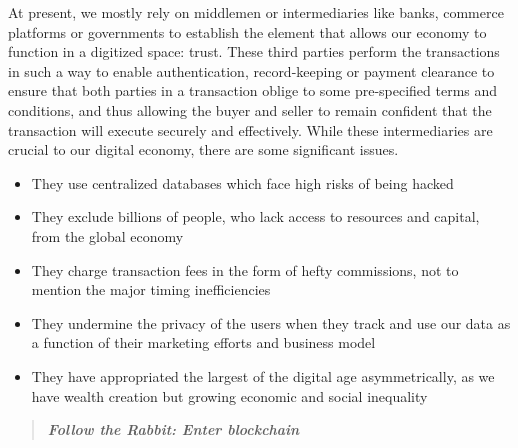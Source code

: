 At present, we mostly rely on middlemen or intermediaries like banks, commerce platforms or governments to establish the element that allows our economy to function in a digitized space: trust. These third parties perform the transactions in such a way to enable authentication, record-keeping or payment clearance to ensure that both parties in a transaction oblige to some pre-specified terms and conditions, and thus allowing the buyer and seller to remain confident that the transaction will execute securely and effectively.
While these intermediaries are crucial to our digital economy, there are some significant issues.

\begin{itemize}
    \setlength\itemsep{0em}

    \item They use centralized databases which face high risks of being hacked
    \item They exclude billions of people, who lack access to resources and capital, from the global economy
    \item They charge transaction fees in the form of hefty commissions, not to mention the major timing inefficiencies
    \item They undermine the privacy of the users when they track and use our data as a function of their marketing efforts and business model
    \item They have appropriated the largest of the digital age asymmetrically, as we have wealth creation but growing economic and social inequality
\end{itemize}

\begin{quote}
    \textbf{\emph{Follow the Rabbit: Enter blockchain}}
\end{quote}


